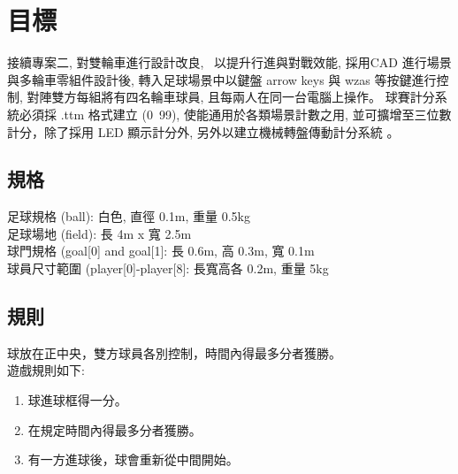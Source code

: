 \chapter{目標}
接續專案二, 對雙輪車進行設計改良,  以提升行進與對戰效能, 採用CAD 進行場景與多輪車零組件設計後, 轉入足球場景中以鍵盤 arrow keys 與 wzas 等按鍵進行控制, 對陣雙方每組將有四名輪車球員, 且每兩人在同一台電腦上操作。
球賽計分系統必須採 .ttm 格式建立 (0~99), 使能通用於各類場景計數之用, 並可擴增至三位數計分，除了採用 LED 顯示計分外, 另外以建立機械轉盤傳動計分系統 。

\section{規格}
足球規格 (ball): 白色, 直徑 0.1m, 重量 0.5kg \\
足球場地 (field): 長 4m x 寬 2.5m \\
球門規格 (goal[0] and goal[1]: 長 0.6m, 高 0.3m, 寬 0.1m \\
球員尺寸範圍 (player[0]-player[8]: 長寬高各 0.2m, 重量 5kg \\

\section{規則}
球放在正中央，雙方球員各別控制，時間內得最多分者獲勝。 \\
遊戲規則如下: \\
\begin{enumerate}
\item 球進球框得一分。 \\
\item 在規定時間內得最多分者獲勝。 \\
\item 有一方進球後，球會重新從中間開始。 \\
\end{enumerate}
